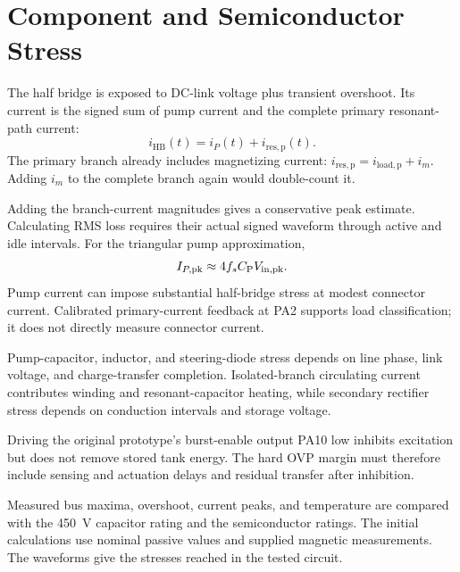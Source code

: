 \section{Component and Semiconductor Stress}
\label{sec:analysis-stress}

The half bridge is exposed to DC-link voltage plus transient overshoot. Its current is the signed sum of pump current and the complete primary resonant-path current:
\begin{equation}
i_{\mathrm{HB}}(t)=i_P(t)+i_{\mathrm{res,p}}(t).
\end{equation}
The primary branch already includes magnetizing current: \(i_{\mathrm{res,p}}=i_{\mathrm{load,p}}+i_m\). Adding \(i_m\) to the complete branch again would double-count it.

Adding the branch-current magnitudes gives a conservative peak estimate. Calculating RMS loss requires their actual signed waveform through active and idle intervals. For the triangular pump approximation,
\begin{equation}
I_{P,\mathrm{pk}}\approx4f_sC_{\mathrm{P}} V_{\mathrm{in,pk}}.
\end{equation}
Pump current can impose substantial half-bridge stress at modest connector current. Calibrated primary-current feedback at PA2 supports load classification; it does not directly measure connector current.

Pump-capacitor, inductor, and steering-diode stress depends on line phase, link voltage, and charge-transfer completion. Isolated-branch circulating current contributes winding and resonant-capacitor heating, while secondary rectifier stress depends on conduction intervals and storage voltage.

Driving the original prototype's burst-enable output PA10 low inhibits excitation but does not remove stored tank energy. The hard OVP margin must therefore include sensing and actuation delays and residual transfer after inhibition.

Measured bus maxima, overshoot, current peaks, and temperature are compared with the \SI{450}{\volt} capacitor rating and the semiconductor ratings. The initial calculations use nominal passive values and supplied magnetic measurements. The waveforms give the stresses reached in the tested circuit.
